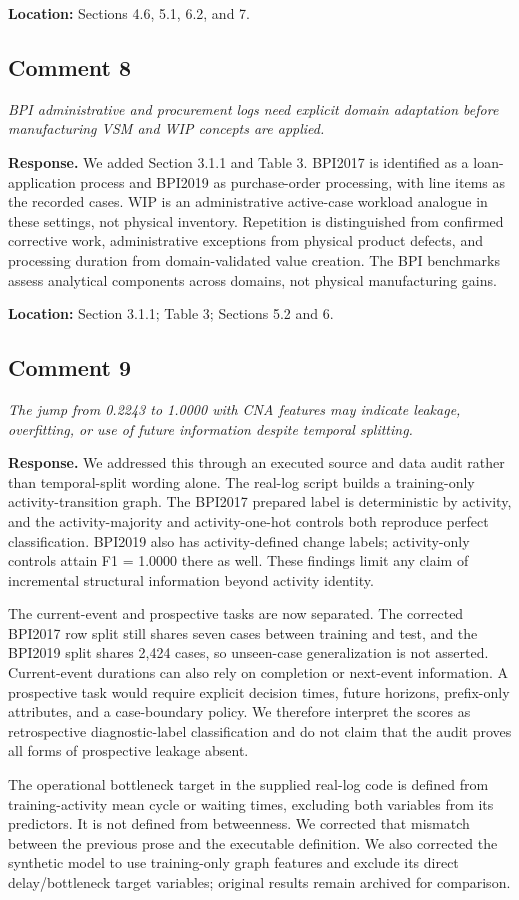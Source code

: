 \documentclass[11pt,a4paper]{article}
\newcommand{\commentitem}[2]{\Needspace{9\baselineskip}\subsection*{Comment #1}\textit{#2}\par\textbf{Response.} }
\begin{document}
\textbf{Location:} Sections 4.6, 5.1, 6.2, and 7.

\commentitem{8}{BPI administrative and procurement logs need explicit domain adaptation before manufacturing VSM and WIP concepts are applied.}
We added Section 3.1.1 and Table 3. BPI2017 is identified as a loan-application process and BPI2019 as purchase-order processing, with line items as the recorded cases. WIP is an administrative active-case workload analogue in these settings, not physical inventory. Repetition is distinguished from confirmed corrective work, administrative exceptions from physical product defects, and processing duration from domain-validated value creation. The BPI benchmarks assess analytical components across domains, not physical manufacturing gains.

\textbf{Location:} Section 3.1.1; Table 3; Sections 5.2 and 6.

\commentitem{9}{The jump from 0.2243 to 1.0000 with CNA features may indicate leakage, overfitting, or use of future information despite temporal splitting.}
We addressed this through an executed source and data audit rather than temporal-split wording alone. The real-log script builds a training-only activity-transition graph. The BPI2017 prepared label is deterministic by activity, and the activity-majority and activity-one-hot controls both reproduce perfect classification. BPI2019 also has activity-defined change labels; activity-only controls attain F1 = 1.0000 there as well. These findings limit any claim of incremental structural information beyond activity identity.

The current-event and prospective tasks are now separated. The corrected BPI2017 row split still shares seven cases between training and test, and the BPI2019 split shares 2,424 cases, so unseen-case generalization is not asserted. Current-event durations can also rely on completion or next-event information. A prospective task would require explicit decision times, future horizons, prefix-only attributes, and a case-boundary policy. We therefore interpret the scores as retrospective diagnostic-label classification and do not claim that the audit proves all forms of prospective leakage absent.

The operational bottleneck target in the supplied real-log code is defined from training-activity mean cycle or waiting times, excluding both variables from its predictors. It is not defined from betweenness. We corrected that mismatch between the previous prose and the executable definition. We also corrected the synthetic model to use training-only graph features and exclude its direct delay/bottleneck target variables; original results remain archived for comparison.
\end{document}
